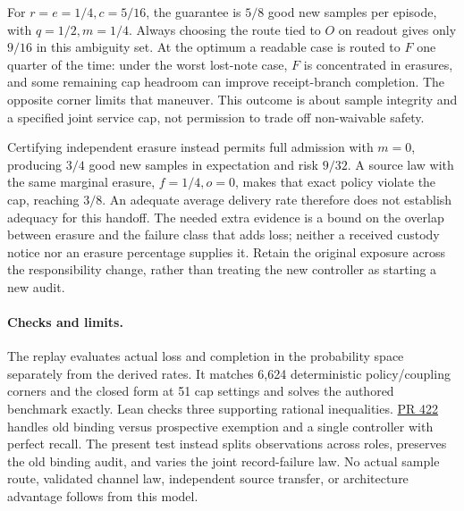 \documentclass[11pt]{article}
\begin{document}
For $r=e=1/4,c=5/16$, the guarantee is $5/8$ good new samples per episode, with $q=1/2,m=1/4$. Always choosing the route tied to $O$ on readout gives only $9/16$ in this ambiguity set. At the optimum a readable case is routed to $F$ one quarter of the time: under the worst lost-note case, $F$ is concentrated in erasures, and some remaining cap headroom can improve receipt-branch completion. The opposite corner limits that maneuver. This outcome is about sample integrity and a specified joint service cap, not permission to trade off non-waivable safety.

Certifying independent erasure instead permits full admission with $m=0$, producing $3/4$ good new samples in expectation and risk $9/32$. A source law with the same marginal erasure, $f=1/4,o=0$, makes that exact policy violate the cap, reaching $3/8$. An adequate average delivery rate therefore does not establish adequacy for this handoff. The needed extra evidence is a bound on the overlap between erasure and the failure class that adds loss; neither a received custody notice nor an erasure percentage supplies it. Retain the original exposure across the responsibility change, rather than treating the new controller as starting a new audit.

\paragraph{Checks and limits.}
The replay evaluates actual loss and completion in the probability space separately from the derived rates. It matches 6,624 deterministic policy/coupling corners and the closed form at 51 cap settings and solves the authored benchmark exactly. Lean checks three supporting rational inequalities. \href{https://github.com/eternal-november/eos-research-programmes/pull/422}{PR 422} handles old binding versus prospective exemption and a single controller with perfect recall. The present test instead splits observations across roles, preserves the old binding audit, and varies the joint record-failure law. No actual sample route, validated channel law, independent source transfer, or architecture advantage follows from this model.
\end{document}
